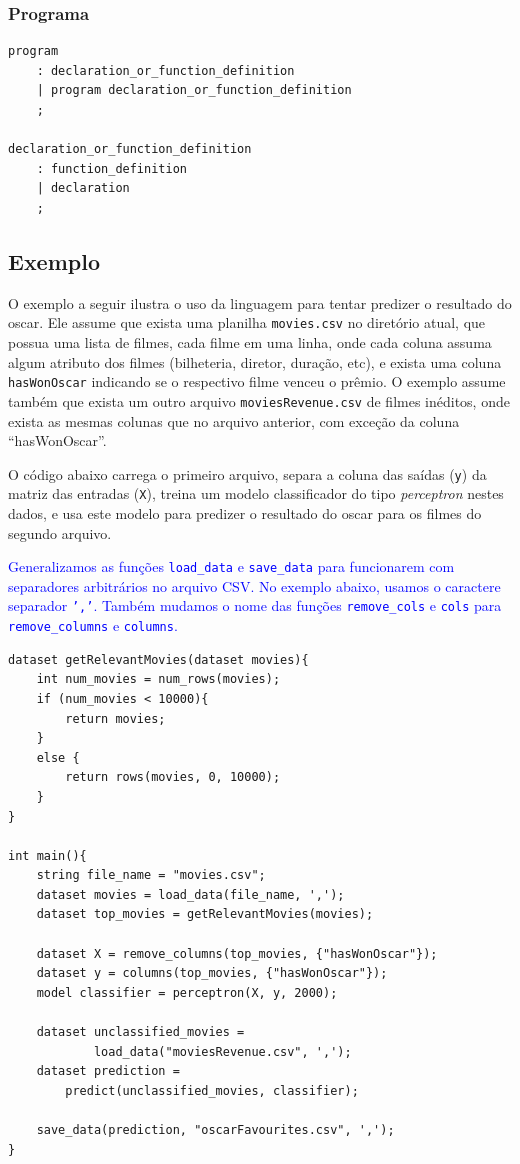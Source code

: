 \documentclass[12pt]{article}
\newcommand{\blu}{\textcolor{blue}}
\begin{document}
\subsubsection{Programa}
\begin{verbatim}
program
    : declaration_or_function_definition
    | program declaration_or_function_definition
    ;

declaration_or_function_definition
    : function_definition
    | declaration
    ;

\end{verbatim}


\subsection{Exemplo}

O exemplo a seguir ilustra o uso da linguagem para tentar predizer o resultado do oscar. Ele assume que exista uma planilha {\tt  movies.csv} no diretório atual, que possua uma lista de filmes, cada filme em uma linha, onde cada coluna assuma algum atributo dos filmes (bilheteria, diretor, duração, etc), e exista uma coluna {\tt hasWonOscar} indicando se o respectivo filme venceu o prêmio. O exemplo assume também que exista um outro arquivo {\tt moviesRevenue.csv} de filmes inéditos, onde exista as mesmas colunas que no arquivo anterior, com exceção da coluna ``hasWonOscar''.

O código abaixo carrega o primeiro arquivo, separa a coluna das saídas ({\tt y}) da matriz das entradas ({\tt X}), treina um modelo classificador do tipo {\it perceptron} nestes dados, e usa este modelo para predizer o resultado do oscar para os filmes do segundo arquivo.

\blu{Generalizamos as funções \texttt{load\_data} e \texttt{save\_data} para funcionarem com separadores arbitrários no arquivo CSV. No exemplo abaixo, usamos o caractere separador \texttt{','}. Também mudamos o nome das funções \texttt{remove\_cols} e \texttt{cols} para \texttt{remove\_columns} e \texttt{columns}.}

\begin{Verbatim}
dataset getRelevantMovies(dataset movies){
	int num_movies = num_rows(movies);
	if (num_movies < 10000){
		return movies;
	}
	else {
		return rows(movies, 0, 10000);
	}
}

int main(){
	string file_name = "movies.csv";
	dataset movies = load_data(file_name, ',');
	dataset top_movies = getRelevantMovies(movies);
	
	dataset X = remove_columns(top_movies, {"hasWonOscar"});
	dataset y = columns(top_movies, {"hasWonOscar"});
	model classifier = perceptron(X, y, 2000);
	
	dataset unclassified_movies = 
			load_data("moviesRevenue.csv", ',');
	dataset prediction = 
		predict(unclassified_movies, classifier);
	
	save_data(prediction, "oscarFavourites.csv", ',');
}
\end{Verbatim}
\end{document}
